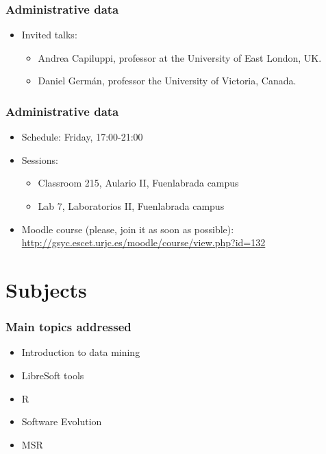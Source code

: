 \documentclass{beamer}
\begin{document}
\begin{frame}
\frametitle{Administrative data}

\begin{itemize}
\item Invited talks:
  \begin{itemize}
  \item Andrea Capiluppi, professor at the University of East London, UK.
  \item Daniel Germ\'an, professor the University of Victoria, Canada.
  \end{itemize}
\end{itemize}
\end{frame}





\begin{frame}
\frametitle{Administrative data}

\begin{itemize}
\item Schedule: Friday, 17:00-21:00
\item Sessions:
  \begin{itemize}
  \item Classroom 215, Aulario II, Fuenlabrada campus
  \item Lab 7, Laboratorios II, Fuenlabrada campus
  \end{itemize}
\item Moodle course (please, join it as soon as possible): \\
  \url{http://gsyc.escet.urjc.es/moodle/course/view.php?id=132}
\end{itemize}
\end{frame}

\section{Subjects}

\begin{frame}
\frametitle{Main topics addressed}

\begin{itemize}
\item Introduction to data mining
\item LibreSoft tools
\item R
\item Software Evolution
\item MSR
\end{itemize}

\end{frame}
\end{document}
